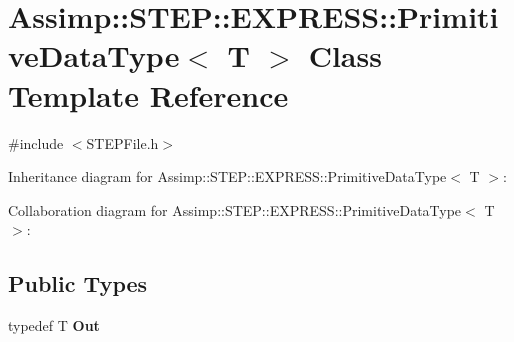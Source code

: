 \hypertarget{class_assimp_1_1_s_t_e_p_1_1_e_x_p_r_e_s_s_1_1_primitive_data_type}{\section{Assimp\+:\+:S\+T\+E\+P\+:\+:E\+X\+P\+R\+E\+S\+S\+:\+:Primitive\+Data\+Type$<$ T $>$ Class Template Reference}
\label{class_assimp_1_1_s_t_e_p_1_1_e_x_p_r_e_s_s_1_1_primitive_data_type}
}


{\ttfamily \#include $<$S\+T\+E\+P\+File.\+h$>$}



Inheritance diagram for Assimp\+:\+:S\+T\+E\+P\+:\+:E\+X\+P\+R\+E\+S\+S\+:\+:Primitive\+Data\+Type$<$ T $>$\+:


Collaboration diagram for Assimp\+:\+:S\+T\+E\+P\+:\+:E\+X\+P\+R\+E\+S\+S\+:\+:Primitive\+Data\+Type$<$ T $>$\+:
\subsection*{Public Types}
\begin{DoxyCompactItemize}
\item 
\hypertarget{class_assimp_1_1_s_t_e_p_1_1_e_x_p_r_e_s_s_1_1_primitive_data_type_ac91efda0657dc149aecb7560dca7e82c}{typedef T {\bfseries Out}}\label{class_assimp_1_1_s_t_e_p_1_1_e_x_p_r_e_s_s_1_1_primitive_data_type_ac91efda0657dc149aecb7560dca7e82c}

\end{DoxyCompactItemize}
